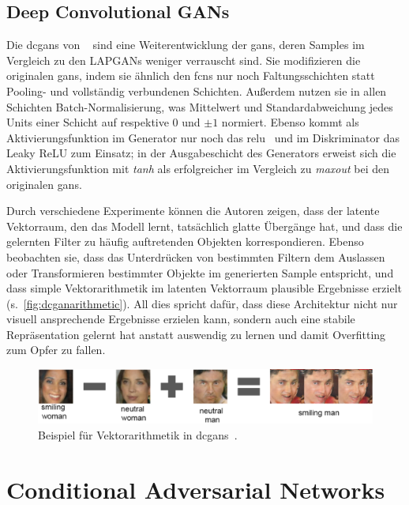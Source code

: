 \subsection{Deep Convolutional GANs}

Die \glspl{dcgan} von \citeauthor{Radford.2016}~\cite{Radford.2016} sind eine Weiterentwicklung der \glspl{gan}, deren Samples im Vergleich zu den LAPGANs weniger verrauscht sind.
Sie modifizieren die originalen \glspl{gan}, indem sie ähnlich den \glspl{fcn} nur noch Faltungsschichten statt Pooling- und vollständig verbundenen Schichten.
Außerdem nutzen sie in allen Schichten Batch-Normalisierung, was Mittelwert und Standardabweichung jedes Units einer Schicht auf respektive 0 und $ \pm 1 $ normiert.
Ebenso kommt als Aktivierungsfunktion im Generator nur noch das \gls{relu}~\cite{Nair.2010} und im Diskriminator das Leaky ReLU zum Einsatz; in der Ausgabeschicht des Generators erweist sich die Aktivierungsfunktion mit \emph{tanh} als erfolgreicher im Vergleich zu \emph{maxout} bei den originalen \glspl{gan}.

Durch verschiedene Experimente können die Autoren zeigen, dass der latente Vektorraum, den das Modell lernt, tatsächlich glatte Übergänge hat, und dass die gelernten Filter zu häufig auftretenden Objekten korrespondieren.
Ebenso beobachten sie, dass das Unterdrücken von bestimmten Filtern dem Auslassen oder Transformieren bestimmter Objekte im generierten Sample entspricht, und dass simple Vektorarithmetik im latenten Vektorraum plausible Ergebnisse erzielt (s.~\autoref{fig:dcganarithmetic}).
All dies spricht dafür, dass diese Architektur nicht nur visuell ansprechende Ergebnisse erzielen kann, sondern auch eine stabile Repräsentation gelernt hat anstatt auswendig zu lernen und damit Overfitting zum Opfer zu fallen.

\begin{figure}
	\centering
	\includegraphics[width=0.9\linewidth]{img/dcgan_arithmetic}
	\caption{Beispiel für Vektorarithmetik in \glspl{dcgan}~\cite{Radford.2016}.}
	\label{fig:dcganarithmetic}
\end{figure}



\section{Conditional Adversarial Networks}

